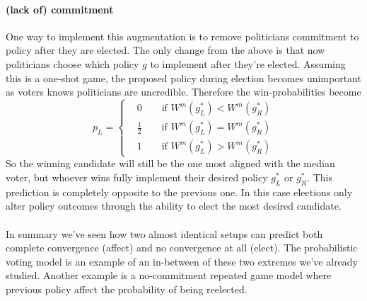 \paragraph{(lack of) commitment} One way to implement this augmentation is to remove politicians commitment to policy after they are elected. The only change from the above is that now politicians choose which policy $g$ to implement after they're elected. Assuming this is a one-shot game, the proposed policy during election becomes unimportant as voters knows politicians are uncredible. Therefore the win-probabilities become
\begin{equation}
    p_L = \begin{cases}
    &    0 \qquad \text{if } W^m(g_L^*) < W^m(g_R^*) \\ 
    &    \frac{1}{2} \qquad \text{if } W^m(g_L^*) = W^m(g_R^*) \\ 
    &    1 \qquad \text{if } W^m(g_L^*) > W^m(g_R^*)
    \end{cases}
\end{equation}
So the winning candidate will still be the one most aligned with the median voter, but whoever wins fully implement their desired policy $g_L^*$ or $g_R^*$. This prediction is completely opposite to the previous one. In this case elections only alter policy outcomes through the ability to elect the most desired candidate.
\\ \\
In summary we've seen how two almost identical setups can predict both complete convergence (affect) and no convergence at all (elect). The probabilistic voting model is an example of an in-between of these two extremes we've already studied. Another example is a no-commitment repeated game model where previous policy affect the probability of being reelected.



